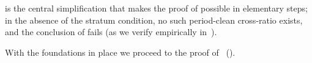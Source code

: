  is the central simplification that makes
the proof of  possible in elementary steps; in the
absence of the stratum condition, no such period-clean cross-ratio
exists, and the conclusion of  fails (as we verify
empirically in~).

\medskip
\noindent
With the foundations in place we proceed to the proof
of~ ().
